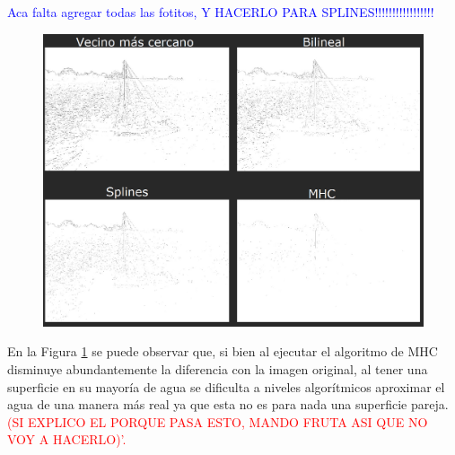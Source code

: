 \documentclass[a4paper]{article}
\begin{document}
\textcolor{blue}{Aca falta agregar todas las fotitos, Y HACERLO PARA SPLINES!!!!!!!!!!!!!!!!!}



\begin{figure}[h!]
	\caption{}
	\begin{center}
	\includegraphics[scale=0.40]{imagenes/comparacion/02/collage}
	\label{imagen2}
  \end{center}
\end{figure}

En la Figura \ref{imagen2}  se puede observar que, si bien al ejecutar el algoritmo de MHC disminuye abundantemente la diferencia con la imagen original, al tener una superficie en su mayor\'ia de agua se dificulta a niveles algor\'itmicos aproximar el agua de una manera m\'as real ya que esta no es para nada una superficie pareja. \textcolor{red}{(SI EXPLICO EL PORQUE PASA ESTO, MANDO FRUTA ASI QUE NO VOY A HACERLO)'.}\\

\newpage
\end{document}
